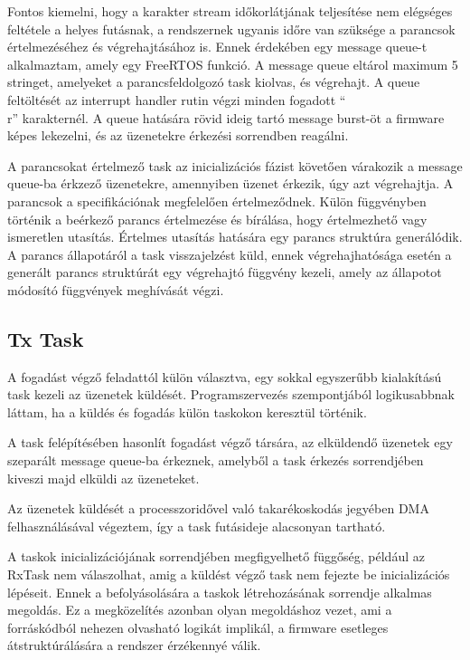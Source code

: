 \medskip

Fontos kiemelni, hogy a karakter stream időkorlátjának teljesítése nem elégséges
feltétele a helyes futásnak, a rendszernek ugyanis időre van szüksége a parancsok
értelmezéséhez és végrehajtásához is. Ennek érdekében egy message queue-t
alkalmaztam, amely egy FreeRTOS funkció. A message queue eltárol maximum 5
stringet, amelyeket a parancsfeldolgozó task kiolvas, és végrehajt. A queue
feltöltését az interrupt handler rutin végzi minden fogadott ``\\r''
karakternél. A queue hatására rövid ideig tartó message burst-öt a firmware képes
lekezelni, és az üzenetekre érkezési sorrendben reagálni. 

\medskip

A parancsokat értelmező task az inicializációs fázist követően várakozik a
message queue-ba érkzező üzenetekre, amennyiben üzenet érkezik, úgy azt
végrehajtja. A parancsok a specifikációnak megfelelően értelmeződnek. Külön
függvényben történik a beérkező parancs értelmezése és bírálása, hogy
értelmezhető vagy ismeretlen utasítás. Értelmes utasítás hatására egy parancs
struktúra generálódik. A parancs állapotáról a task visszajelzést küld, ennek
végrehajhatósága esetén a generált parancs struktúrát egy végrehajtó függvény
kezeli, amely az állapotot módosító függvények meghívását végzi. 

\subsection{Tx Task}

A fogadást végző feladattól külön választva, egy sokkal egyszerűbb kialakítású
task kezeli az üzenetek küldését. Programszervezés szempontjából logikusabbnak
láttam, ha a küldés és fogadás külön taskokon keresztül történik.

A task felépítésében hasonlít fogadást végző társára, az elküldendő üzenetek egy
szeparált message queue-ba érkeznek, amelyből a task érkezés sorrendjében kiveszi
majd elküldi az üzeneteket.

Az üzenetek küldését a processzoridővel való takarékoskodás jegyében DMA
felhasználásával végeztem, így a task futásideje alacsonyan tartható. 

\medskip

A taskok inicializációjának sorrendjében megfigyelhető függőség, például az
RxTask nem válaszolhat, amig a küldést végző task nem fejezte be inicializációs
lépéseit. Ennek a befolyásolására a taskok létrehozásának sorrendje alkalmas
megoldás. Ez a megközelítés azonban olyan megoldáshoz vezet, ami a forráskódból
nehezen olvasható logikát implikál, a firmware esetleges átstruktúrálására a
rendszer érzékennyé válik.

